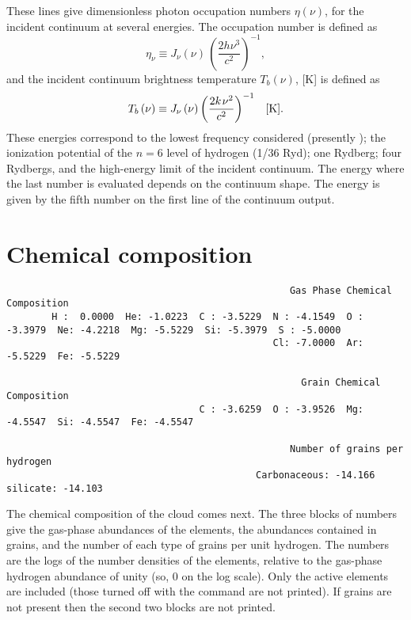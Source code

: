 These lines give dimensionless photon occupation numbers $\eta(\nu)$,
for the incident continuum at several energies.
The occupation number is defined as
\begin{equation}
{\eta _\nu } \equiv {J_\nu }\left( \nu  \right)\,{\left( {\frac{{2h{\nu
^3}}}{{{c^2}}}} \right)^{ - 1}},%
\end{equation}
and the incident continuum brightness temperature ${T_b}( \nu  )$, [K] is defined as
\begin{equation}
{T_b}\left( \nu  \right) \equiv {J_\nu }\left( \nu  \right){\left(
{\frac{{2k{\kern 1pt} {\nu ^2}}}{{{c^2}}}} \right)^{ - 1}}\quad  [\mathrm{K}].%
\end{equation}
These energies correspond to the lowest frequency considered
(presently \emmmhz );
the ionization potential of the $n = 6$ level of hydrogen
(1/36 Ryd); one Rydberg; four Rydbergs, and the high-energy limit of the
incident continuum.
The energy where the last number is evaluated depends
on the continuum shape.
The energy is given by the fifth number on the
first line of the continuum output.

\section{Chemical composition}
{\setverbatimfontsize{\tiny}
\begin{verbatim}
                                                  Gas Phase Chemical Composition
        H :  0.0000  He: -1.0223  C : -3.5229  N : -4.1549  O : -3.3979  Ne: -4.2218  Mg: -5.5229  Si: -5.3979  S : -5.0000
                                               Cl: -7.0000  Ar: -5.5229  Fe: -5.5229

                                                    Grain Chemical Composition
                                  C : -3.6259  O : -3.9526  Mg: -4.5547  Si: -4.5547  Fe: -4.5547

                                                  Number of grains per hydrogen
                                            Carbonaceous: -14.166  silicate: -14.103
\end{verbatim}
}

The chemical composition of the cloud comes next.
The three blocks of
numbers give the gas-phase abundances of the elements, the abundances
contained in grains, and the number of each type of grains per unit hydrogen.
The numbers are the logs of the number densities of the elements, relative
to the gas-phase hydrogen abundance of unity (so, 0 on the log scale).
Only the active elements are included (those turned off with the  command are not printed).
If grains are not present then the second
two blocks are not printed.


